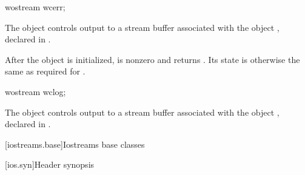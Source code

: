 %
\begin{itemdecl}
wostream wcerr;
\end{itemdecl}

\begin{itemdescr}
\pnum
The object 
controls output to a stream buffer associated with the object ,
declared in .

\pnum
After the object
is initialized,
is nonzero and  returns .
Its state is otherwise the same as required for
.
\end{itemdescr}

%
\begin{itemdecl}
wostream wclog;
\end{itemdecl}

\begin{itemdescr}
\pnum
The object 
controls output to a stream buffer associated with the object ,
declared in .
\end{itemdescr}

[iostreams.base]{Iostreams base classes}

[ios.syn]{Header  synopsis}

